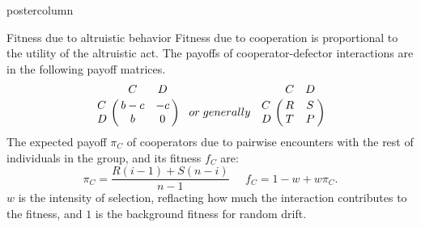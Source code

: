 \documentclass[final,hyperref={pdfpagelabels=false}]{beamer}
\newlength{\columnheight}
\begin{document}
\begin{frame}
\begin{columns}
    \begin{column}{.49\textwidth}
      \begin{beamercolorbox}[center,wd=\textwidth]{postercolumn}
        \begin{minipage}[T]{.95\textwidth} %
          \parbox[t][\columnheight]{\textwidth}{ %
            \begin{block}{Fitness due to altruistic behavior}
            Fitness due to cooperation is proportional to the utility of the altruistic act. The payoffs of cooperator-defector interactions are in the following  payoff matrices\cite{Traulsen2006a,Nowak2011}. 
            \begin{equation}
\bordermatrix{~ & C & D \cr
             C & b-c & -c \cr
              D & b & 0 \cr} \;\;\; or\;generally \;\;\; 
\bordermatrix{~ & C & D \cr
             C & R & S \cr
              D & T & P \cr} 
\end{equation}
The expected payoff $\pi_{C}$ of cooperators due to pairwise encounters with the rest of individuals in the group, and its fitness $f_{C}$ are:
\begin{equation}
 \pi_{C}=\frac{R(i-1)+S(n-i)}{n-1} \;\;\;\;\; f_{C}=1-w+w\pi_{C}.
\end{equation}
 $w$ is the intensity of selection, reflacting how much the interaction contributes to the fitness, and $1$ is the background fitness for random drift.
           

\end{block}}
\end{minipage}
\end{beamercolorbox}
\end{column}
\end{columns}
\end{frame}
\end{document}
